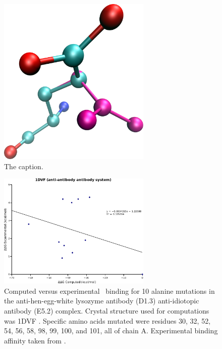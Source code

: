 \begin{figure}[h]
  \centering
  \includegraphics[width=0.65\textwidth,height=0.3\textheight,keepaspectratio]{figures/mutation_side_chain_images/1brs_chain_d_80.png}
  \caption{The caption.}
  \label{figure:computational_mutation_scanning/figname}
\end{figure}
\clearpage

\begin{figure}[h]
    \centering
  \includegraphics[width=0.65\textwidth]{figures/1dvf.png}
  \caption{
Computed versus experimental \ddg\ binding for 10 alanine mutations in the anti-hen-egg-white lysozyme antibody (D1.3) anti-idiotopic antibody (E5.2) complex.
Crystal structure used for computations was 1DVF \protect\cite{braden1996crystal}.
Specific amino acids mutated were residues 30, 32, 52, 54, 56, 58, 98, 99, 100, and 101, all of chain A.
Experimental binding affinity taken from \protect\cite{thorn2001asedb}.
            }
\end{figure}

